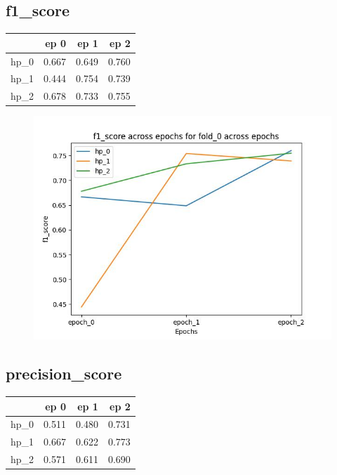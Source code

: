 \documentclass{article}
\begin{document}
\subsection{f1\_score}
\begin{tabular}{lrrr}
\toprule
{} &   ep 0 &   ep 1 &   ep 2 \\
\midrule
hp\_0 &  0.667 &  0.649 &  0.760 \\
hp\_1 &  0.444 &  0.754 &  0.739 \\
hp\_2 &  0.678 &  0.733 &  0.755 \\
\bottomrule
\end{tabular}

\begin{figure}[H]
\includegraphics[scale = 0.75]{fold_0/f1_score}
\end{figure}
\subsection{precision\_score}
\begin{tabular}{lrrr}
\toprule
{} &   ep 0 &   ep 1 &   ep 2 \\
\midrule
hp\_0 &  0.511 &  0.480 &  0.731 \\
hp\_1 &  0.667 &  0.622 &  0.773 \\
hp\_2 &  0.571 &  0.611 &  0.690 \\
\bottomrule
\end{tabular}
\end{document}
